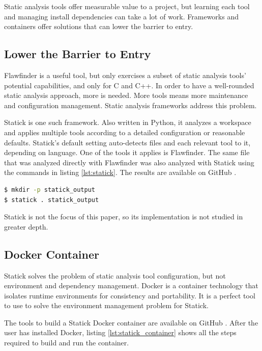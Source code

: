 \documentclass[journal]{IEEEtran}
\begin{document}
Static analysis tools offer measurable value to a project, but learning each tool and managing
install dependencies can take a lot of work. Frameworks and containers offer solutions that can
lower the barrier to entry.

\subsection{Lower the Barrier to Entry}

Flawfinder is a useful tool, but only exercises a subset of static analysis tools' potential
capabilities, and only for C and C++. In order to have a well-rounded static analysis approach, more
is needed. More tools means more maintenance and configuration management. Static analysis
frameworks address this problem.

Statick \cite{statick} is one such framework. Also written in Python, it analyzes a workspace and
applies multiple tools according to a detailed configuration or reasonable defaults. Statick's
default setting auto-detects files and each relevant tool to it, depending on language. One of the
tools it applies is Flawfinder. The same file that was analyzed directly with Flawfinder was also
analyzed with Statick using the commands in listing \ref{lst:statick}. The results are available
on GitHub \cite{this_repo}.

\begin{lstlisting}[language=bash, caption=Example Statick Commands, label=lst:statick]
$ mkdir -p statick_output
$ statick . statick_output
\end{lstlisting}

Statick is not the focus of this paper, so its implementation is not studied in greater depth.

\subsection{Docker Container}

Statick solves the problem of static analysis tool configuration, but not environment and dependency
management. Docker is a container technology that isolates runtime environments for consistency and
portability. It is a perfect tool to use to solve the environment management problem for Statick.

The tools to build a Statick Docker container are available on GitHub \cite{statick_container}.
After the user has installed Docker, listing \ref{lst:statick_container} shows all the steps
required to build and run the container.
\end{document}
